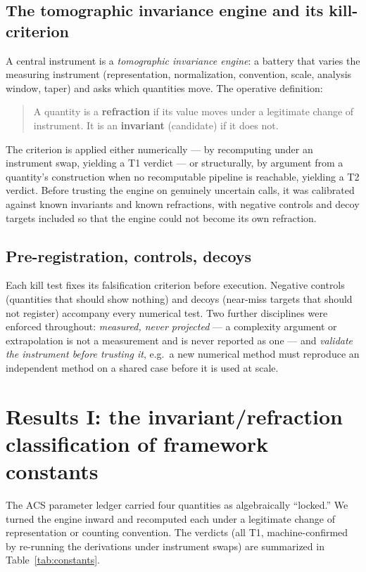 \documentclass[11pt]{article}
\newcommand{\tier}[1]{\textsf{#1}}
\begin{document}
\subsection{The tomographic invariance engine and its kill-criterion}
A central instrument is a \emph{tomographic invariance engine}: a battery that varies
the measuring instrument (representation, normalization, convention, scale, analysis
window, taper) and asks which quantities move. The operative definition:
\begin{quote}
A quantity is a \textbf{refraction} if its value moves under a legitimate change of
instrument. It is an \textbf{invariant} (candidate) if it does not.
\end{quote}
The criterion is applied either numerically --- by recomputing under an instrument swap,
yielding a \tier{T1} verdict --- or structurally, by argument from a quantity's
construction when no recomputable pipeline is reachable, yielding a \tier{T2} verdict.
Before trusting the engine on genuinely uncertain calls, it was calibrated against known
invariants and known refractions, with negative controls and decoy targets included so
that the engine could not become its own refraction.

\subsection{Pre-registration, controls, decoys}
Each kill test fixes its falsification criterion before execution. Negative controls
(quantities that should show nothing) and decoys (near-miss targets that should not
register) accompany every numerical test. Two further disciplines were enforced
throughout: \emph{measured, never projected} --- a complexity argument or extrapolation
is not a measurement and is never reported as one --- and \emph{validate the instrument
before trusting it}, e.g.\ a new numerical method must reproduce an independent method on
a shared case before it is used at scale.

\section{Results I: the invariant/refraction classification of framework constants}
\label{sec:constants}

The ACS parameter ledger carried four quantities as algebraically ``locked.'' We turned
the engine inward and recomputed each under a legitimate change of representation or
counting convention. The verdicts (all \tier{T1}, machine-confirmed by re-running the
derivations under instrument swaps) are summarized in Table~\ref{tab:constants}.
\end{document}
